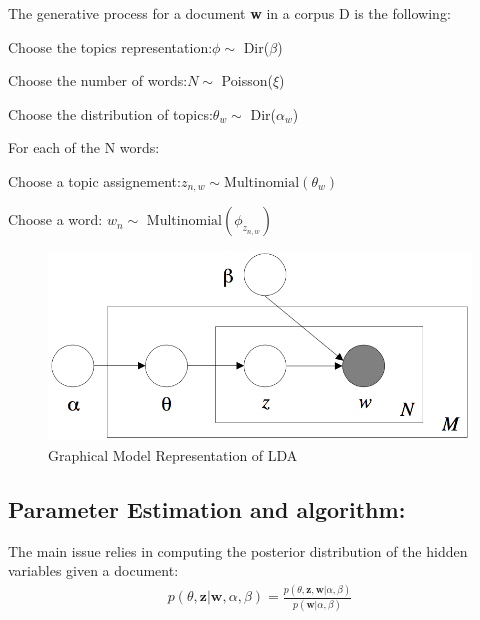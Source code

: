 \documentclass[twoside]{article}
\begin{document}
\begin{multicols}{2}
\noindent The generative process for a document \textbf{w} in a corpus D is the following:
\\
\begin{compactenum}
	\item Choose the topics representation:\newline $\phi \sim$ Dir($\beta$)
	\item Choose the number of words:\newline $ N \sim $ Poisson($ \xi $)
	\item Choose the distribution of topics:\newline $\theta_w \sim$ Dir($\alpha_w$)
	\item For each of the N words:
	\begin{compactenum}
		\item Choose a topic assignement:\newline $z_{n,w} \sim \text{Multinomial}(\theta_w)$
		\item Choose a word: \newline$w_n \sim \text{ Multinomial}(\phi_{z_{n,w}})$
	\end{compactenum}
\end{compactenum}

\begin{figure}[H]
\centering
\includegraphics[width=0.8\linewidth]{LDA.png}
\caption{Graphical Model Representation of LDA}
\end{figure}

\subsection{Parameter Estimation and algorithm:}

The main issue relies in computing the posterior distribution of the hidden variables given a document:\\

\begin{align*}
p(\theta, \mathbf{z} |\mathbf{w}, \alpha, \beta) = \frac{p(\theta, \mathbf{z}, \mathbf{w} | \alpha, \beta)}{p(\mathbf{w} | \alpha, \beta)}
\end{align*}


\end{multicols}
\end{document}
